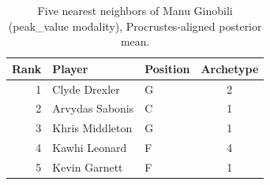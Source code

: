 \begin{table}[htbp]
  \centering\small
  \begin{tabular}{rllc}
    \toprule
    Rank & Player & Position & Archetype \\
    \midrule
    1 & Clyde Drexler & G & 2 \\
    2 & Arvydas Sabonis & C & 1 \\
    3 & Khris Middleton & G & 1 \\
    4 & Kawhi Leonard & F & 4 \\
    5 & Kevin Garnett & F & 1 \\
    \bottomrule
  \end{tabular}
  \caption{Five nearest neighbors of Manu Ginobili (peak_value modality), Procrustes-aligned posterior mean.}
  \label{tab:Manu_Ginobili_neighbors_peak_value}
\end{table}

